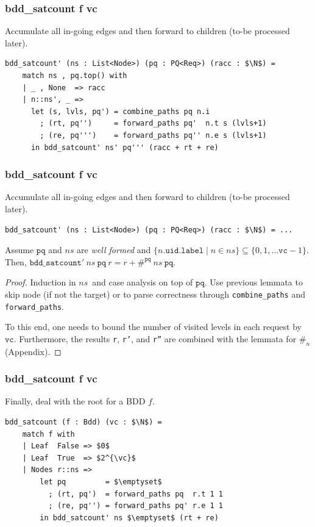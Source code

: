 \documentclass[english, aspectratio=169]{beamer}
\newcommand{\ns}[0]{\ensuremath{\mathit{ns}}}
\newcommand{\pq}[0]{\ensuremath{\texttt{pq}}}
\newcommand{\vc}[0]{\ensuremath{\texttt{vc}}}
\newcommand{\countPQ}[0]{\ensuremath{\#^{\pq}}}
\begin{document}
\begin{frame}[t, fragile]
  \frametitle{bdd\_satcount f vc}

  Accumulate all in-going edges and then forward to children (to-be processed later).
  \begin{lstlisting}
bdd_satcount' (ns : List<Node>) (pq : PQ<Req>) (racc : $\N$) =
    match ns , pq.top() with
    | _ , None  => racc
    | n::ns', _ =>
      let (s, lvls, pq') = combine_paths pq n.i
        ; (rt, pq'')     = forward_paths pq'  n.t s (lvls+1)
        ; (re, pq''')    = forward_paths pq'' n.e s (lvls+1)
      in bdd_satcount' ns' pq''' (racc + rt + re)
    \end{lstlisting}
\end{frame}

\begin{frame} %
  \frametitle{bdd\_satcount f vc}

  Accumulate all in-going edges and then forward to children (to-be processed later).
  \begin{lstlisting}
bdd_satcount' (ns : List<Node>) (pq : PQ<Req>) (racc : $\N$) = ...
  \end{lstlisting}

  \begin{lemma}
    Assume $\pq$ and $\ns$ are \emph{well formed} and
    $\{ n.\texttt{uid}.\texttt{label} \mid n \in \ns \} \subseteq \{ 0, 1, \dots \vc-1 \}$. Then,
    $\texttt{bdd\_satcount}'\ \ns\ \pq\ r = r + \countPQ\ \ns\ \pq$.
  \end{lemma}
  \begin{proof}
    \small

    Induction in \ns\ and case analysis on top of \pq. Use previous lemmata to skip node (if not the
    target) or to parse correctness through \texttt{combine\_paths} and \texttt{forward\_paths}.

    To this end, one needs to bound the number of visited levels in each request by \vc.
    Furthermore, the results \texttt{r}, \texttt{r'}, and \texttt{r''} are combined with the lemmata
    for $\#_n$ (Appendix).
  \end{proof}
\end{frame}


\begin{frame}[t, fragile]
  \frametitle{bdd\_satcount f vc}

  Finally, deal with the root for a BDD $f$.

  \begin{lstlisting}
bdd_satcount (f : Bdd) (vc : $\N$) =
    match f with
    | Leaf  False => $0$
    | Leaf  True  => $2^{\vc}$
    | Nodes r::ns =>
        let pq         = $\emptyset$
          ; (rt, pq')  = forward_paths pq  r.t 1 1
          ; (re, pq'') = forward_paths pq' r.e 1 1
        in bdd_satcount' ns $\emptyset$ (rt + re)
  \end{lstlisting}
\end{frame}
\end{document}
